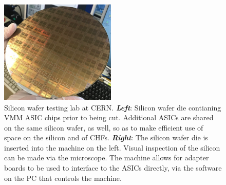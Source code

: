 \begin{figure}[!htb]
    \begin{center}
        \includegraphics[width=0.49\textwidth]{figures/nsw/use_cases/verso_use_case_vmm_die}
        \caption{
            Silicon wafer testing lab at CERN.
            \textbf{\textit{Left}}: Silicon wafer die contianing VMM ASIC chips prior to being cut.
                Additional ASICs are shared on the same silicon wafer, as well, so as to make efficient
                use of space on the silicon and of CHFs.
            \textbf{\textit{Right}}: The silicon wafer die is inserted into the machine on the left.
                Visual inspection of the silicon can be made via the microscope.
                The machine allows for adapter boards to be used to interface to the ASICs directly,
                via the software on the PC that controls the machine.
        }
        \label{fig:vrs_vmm_prod}
    \end{center}
\end{figure}
